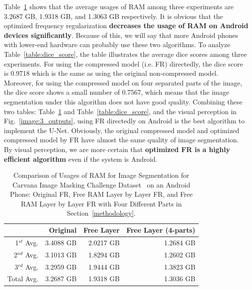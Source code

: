 \documentclass[runningheads]{llncs}
\begin{document}
 Table~\ref{table:ram_usage} shows that the average usages of RAM among three experiments are 3.2687 GB, 1.9318 GB, and 1.3063 GB respectively. It is obvious that the optimized frequency regularization \textbf{decreases the usage of RAM on Android devices significantly}. Because of this, we will say that more Android phones with lower-end hardware can probably use these two algorithms. To analyze Table~\ref{table:dice_score}, the table illustrates the average dice scores among three experiments. For using the compressed model (i.e. FR) directedly, the dice score is 0.9718 which is the same as using the original non-compressed model. Moreover, for using the compressed model on four separated parts of the image, the dice score shows a small number of 0.7567, which means that the image segmentation under this algorithm does not have good quality. Combining these two tables: Table~\ref{table:ram_usage} and Table~\ref{table:dice_score}, and the visual perception in Fig.~\ref{image:3_outputs}, using FR directedly on Android is the best algorithm to implement the U-Net. Obviously, the original compressed model and optimized compressed model by FR have almost the same quality of image segmentation. By visual perception, we are more certain that \textbf{optimized FR is a highly efficient algorithm} even if the system is Android.


\begin{table}[H]
	\caption{Comparison of Usages of RAM for Image Segmentation for Carvana Image Masking Challenge Dataset~\cite{brian2017carvanadataset} on an Android Phone: Original FR, Free RAM Layer by Layer FR, and Free RAM Layer by Layer FR with Four Different Parts in Section~\ref{methodology}.} 
	\label{table:ram_usage}
	\small
	\centering
	\setlength{\tabcolsep}{10pt}
	\begin{tabular}{rrrr}
		\toprule
		& Original & Free Layer & Free Layer (4-parts)\\
		\midrule\midrule
		1$^{st}$ Avg.&3.4088 GB&2.0217 GB&1.2684 GB\\
		2$^{nd}$ Avg.&3.1013 GB&1.8294 GB&1.2602 GB\\
		3$^{rd}$ Avg.&3.2959 GB&1.9444 GB&1.3823 GB\\
		\cdashline{1-4}
		Total Avg.&3.2687 GB&1.9318 GB&1.3036 GB\\
		\bottomrule
	\end{tabular}
\end{table}
\end{document}
